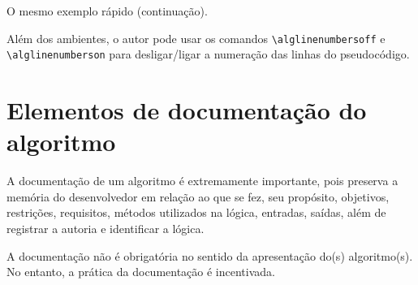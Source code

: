 \documentclass[a4paper,12pt,oneside,onecolumn,final,fleqn]{repUERJ}
\begin{document}
\begin{algorithm*}[!ht]
    \caption{O mesmo exemplo rápido (continuação).}
    \begin{pseudocode*}
    \Continuacao
        \Repetir
        
            \Parar
        \FimSe
    \FimAlgoritmo
    \end{pseudocode*}
\end{algorithm*}

Além dos ambientes, o autor pode usar os comandos \texttt{\textbackslash alglinenumbersoff} e \texttt{\textbackslash alg\-line\-numberson} para desligar/ligar a numeração das linhas do pseudocódigo.

\section{Elementos de documentação do algoritmo}

A documentação de um algoritmo é extremamente importante, pois preserva a memória do desenvolvedor em relação ao que se fez, seu propósito, objetivos, restrições, requisitos, métodos utilizados na lógica, entradas, saídas, além de registrar a autoria e identificar a lógica.

A documentação não é obrigatória no sentido da apresentação do(s) algoritmo(s). No entanto, a prática da documentação é incentivada.
\end{document}
